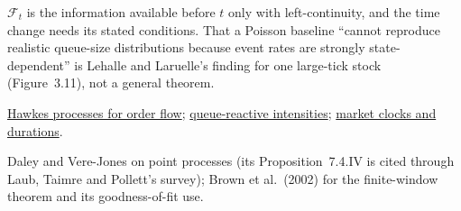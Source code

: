 \begin{qfdefinition}
 $\mathcal F_t$ is the information available before $t$ only with left-continuity, and the time change needs its stated conditions. That a Poisson baseline ``cannot reproduce realistic queue-size distributions because event rates are strongly state-dependent'' is Lehalle and Laruelle's finding for one large-tick stock (Figure~3.11), not a general theorem.

 \hyperref[mod:hawkes-order-flow]{Hawkes processes for order flow}; \hyperref[mod:queue-reactive-intensities]{queue-reactive intensities}; \hyperref[def:market-clocks-durations]{market clocks and durations}.

 Daley and Vere-Jones on point processes (its Proposition~7.4.IV is cited through Laub, Taimre and Pollett's survey); Brown et al.\ (2002) for the finite-window theorem and its goodness-of-fit use.

\end{qfdefinition}

